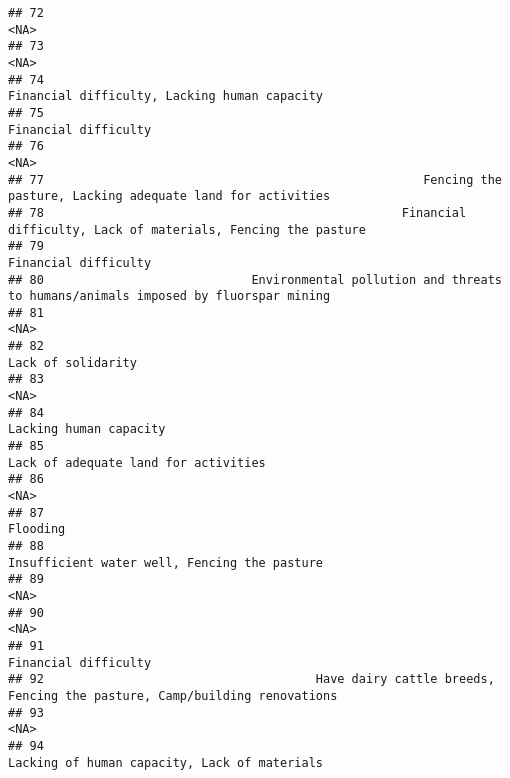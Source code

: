\documentclass[
]{article}
\begin{document}
\begin{verbatim}
## 72                                                                                                          <NA>
## 73                                                                                                          <NA>
## 74                                                                  Financial difficulty, Lacking human capacity
## 75                                                                                          Financial difficulty
## 76                                                                                                          <NA>
## 77                                                     Fencing the pasture, Lacking adequate land for activities
## 78                                                  Financial difficulty, Lack of materials, Fencing the pasture
## 79                                                                                          Financial difficulty
## 80                             Environmental pollution and threats to humans/animals imposed by fluorspar mining
## 81                                                                                                          <NA>
## 82                                                                                            Lack of solidarity
## 83                                                                                                          <NA>
## 84                                                                                        Lacking human capacity
## 85                                                                          Lack of adequate land for activities
## 86                                                                                                          <NA>
## 87                                                                                                      Flooding
## 88                                                                  Insufficient water well, Fencing the pasture
## 89                                                                                                          <NA>
## 90                                                                                                          <NA>
## 91                                                                                          Financial difficulty
## 92                                      Have dairy cattle breeds, Fencing the pasture, Camp/building renovations
## 93                                                                                                          <NA>
## 94                                                                  Lacking of human capacity, Lack of materials

\end{verbatim}
\end{document}
